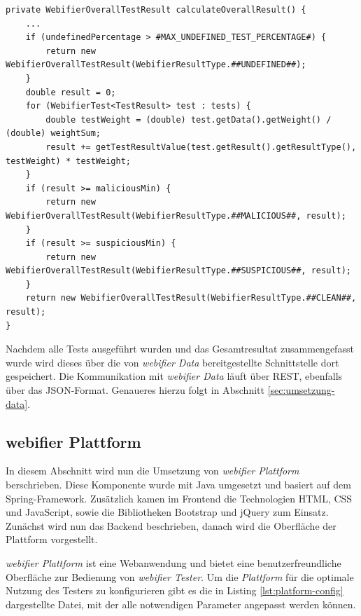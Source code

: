 \begin{scriptsize}
\begin{lstlisting}
private WebifierOverallTestResult calculateOverallResult() {
    ...
    if (undefinedPercentage > #MAX_UNDEFINED_TEST_PERCENTAGE#) {
        return new WebifierOverallTestResult(WebifierResultType.##UNDEFINED##);
    }
    double result = 0;
    for (WebifierTest<TestResult> test : tests) {
        double testWeight = (double) test.getData().getWeight() / (double) weightSum;
        result += getTestResultValue(test.getResult().getResultType(), testWeight) * testWeight;
    }
    if (result >= maliciousMin) {
        return new WebifierOverallTestResult(WebifierResultType.##MALICIOUS##, result);
    }
    if (result >= suspiciousMin) {
        return new WebifierOverallTestResult(WebifierResultType.##SUSPICIOUS##, result);
    }
    return new WebifierOverallTestResult(WebifierResultType.##CLEAN##, result);
}
\end{lstlisting}
\end{scriptsize}

Nachdem alle Tests ausgeführt wurden und das Gesamtresultat zusammengefasst wurde wird dieses über
die von \textit{webifier Data} bereitgestellte Schnittstelle dort gespeichert. Die Kommunikation mit
\textit{webifier Data} läuft über \ac{REST}, ebenfalls über das \ac{JSON}-Format. Genaueres hierzu
folgt in Abschnitt \ref{sec:umsetzung-data}.

\subsection{webifier Plattform}

In diesem Abschnitt wird nun die Umsetzung von \textit{webifier Plattform} berschrieben. Diese
Komponente wurde mit Java umgesetzt und basiert auf dem Spring-Framework. Zusätzlich kamen im Frontend die Technologien \ac{HTML}, \ac{CSS} und JavaScript, sowie die Bibliotheken Bootstrap und jQuery zum Einsatz. Zunächst wird nun das Backend beschrieben, danach wird die Oberfläche der Plattform vorgestellt.

\textit{webifier Plattform} ist eine Webanwendung und bietet eine benutzerfreundliche Oberfläche zur
Bedienung von \textit{webifier Tester}. Um die \textit{Plattform} für die optimale Nutzung des
Testers zu konfigurieren gibt es die in Listing \ref{lst:platform-config} dargestellte Datei, mit der alle notwendigen Parameter angepasst werden können.

